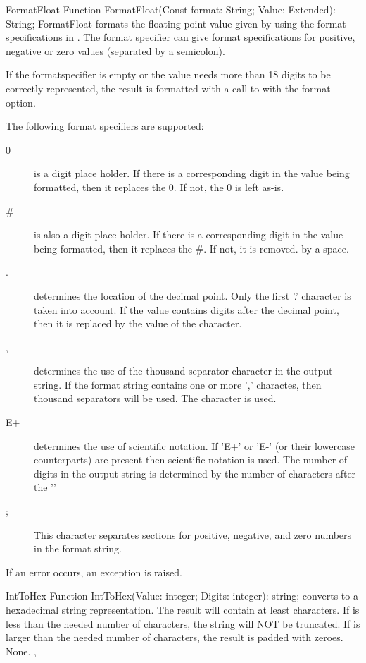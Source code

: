 \begin{function}{FormatFloat}
\Declaration
Function FormatFloat(Const format: String; Value: Extended): String;
\Description
FormatFloat formats the floating-point value given by  using 
the format specifications in . The format specifier can give
format specifications for positive, negative or zero values (separated by 
a semicolon).


If the formatspecifier is empty or the value needs more than 18 digits to
be correctly represented, the result is formatted with a call to 
 with the  format option.

The following format specifiers are supported:
\begin{description}
\item[0] is a digit place holder. If there is a corresponding digit in 
the value being formatted, then it replaces the 0. If not, the 0 is left
as-is.
\item[\#] is also a digit place holder. If there is a corresponding digit in
the value being formatted, then it replaces the \#. If not, it is removed.
by a space.
\item[.] determines the location of the decimal point. Only the first '.'
character is taken into account. If the value contains digits after the
decimal point, then it is replaced by the value of the 
character.
\item[,] determines the use of the thousand separator character in the
output string. If the format string contains one or more ',' charactes, 
then thousand separators will be used. The  character
is used.
\item[E+] determines the use of scientific notation. If 'E+' or 'E-' (or
their lowercase counterparts) are present then scientific notation is used.
The number of digits in the output string is determined by the number of
 characters after the ''
\item[;] This character separates sections for positive, negative, and zero numbers in the
format string.	
\end{description}
\Errors
If an error occurs, an exception is raised.
\SeeAlso
{}
\end{function}


\begin{function}{IntToHex}
\Declaration
Function IntToHex(Value: integer; Digits: integer): string;
\Description
{} converts  to a hexadecimal string
representation. The result will contain at least 
characters. If  is less than the needed number of characters,
the string will NOT be truncated. If  is larger than the needed
number of characters, the result is padded with zeroes.
\Errors
None.
\SeeAlso
{}, 
\end{function}

